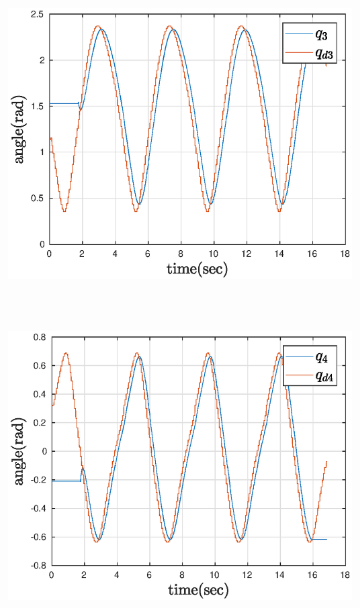 \begin{figure}[htbp]
\begin{subfigure}[htbp]{0.45\textwidth}
        \centering
        \includegraphics[width = \picsSiz\linewidth]{img/pathF3.eps}
        \caption{}
    \end{subfigure}
    ~ 
    \begin{subfigure}[htbp]{0.45\textwidth}
        \centering
        \includegraphics[width = \picsSiz\linewidth]{img/pathF4.eps}
        \caption{}
    \end{subfigure}
    ~
    \begin{subfigure}[htbp]{0.45\textwidth}
        \centering

\end{subfigure}
\end{figure}
